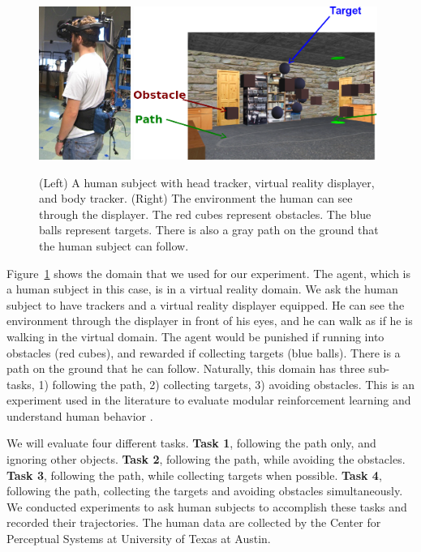 \begin{figure}[h!]
\centering
\includegraphics[height=5cm]{human.jpg}
\includegraphics[height=5cm]{env.png}
\caption{(Left) A human subject with head tracker, virtual reality displayer, and
body tracker.  (Right) The environment the human can see through the displayer.
The red cubes represent obstacles. The blue balls represent targets. There is
also a gray path on the ground that the human subject can follow.}
\label{fig:avatar}
\end{figure}

Figure~\ref{fig:avatar} shows the domain that we used for our experiment. The
agent, which is a human subject in this case, is in a virtual reality domain.
We ask the human subject to have trackers and a virtual reality displayer
equipped. He can see the environment through the displayer in front of his eyes,
and he can walk as if he is walking in the virtual domain.
The agent would be punished if running into obstacles (red cubes), and rewarded
if collecting targets (blue balls). There is a path on the ground that he can
follow.
Naturally, this domain has three sub-tasks, 1) following the path, 2)
collecting targets, 3) avoiding obstacles.
This is an experiment used in the literature to evaluate modular reinforcement
learning \cite{rothkopf2013modular} and understand human behavior \cite{Tong2014}.

We will evaluate four different tasks. {\bf Task 1}, following the path only, and
ignoring other objects. {\bf Task 2}, following the path, while avoiding the obstacles.
{\bf Task 3}, following the path, while collecting targets when possible. {\bf Task 4},
following the path, collecting the targets and avoiding obstacles
simultaneously.
We conducted experiments to ask human subjects to accomplish these tasks and
recorded their trajectories. The human data are collected by the Center for
Perceptual Systems at University of Texas at Austin.

